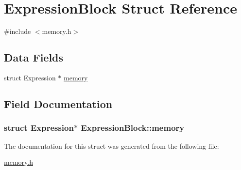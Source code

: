 \hypertarget{structExpressionBlock}{\section{Expression\+Block Struct Reference}
\label{structExpressionBlock}
}


{\ttfamily \#include $<$memory.\+h$>$}

\subsection*{Data Fields}
\begin{DoxyCompactItemize}
\item 
struct Expression $\ast$ \hyperlink{structExpressionBlock_a964183cfa856f56558c061035d539c86}{memory}
\end{DoxyCompactItemize}


\subsection{Field Documentation}
\hypertarget{structExpressionBlock_a964183cfa856f56558c061035d539c86}{
\subsubsection[{memory}]{\setlength{\rightskip}{0pt plus 5cm}struct Expression$\ast$ Expression\+Block\+::memory}}\label{structExpressionBlock_a964183cfa856f56558c061035d539c86}


The documentation for this struct was generated from the following file\+:\begin{DoxyCompactItemize}
\item 
\hyperlink{memory_8h}{memory.\+h}\end{DoxyCompactItemize}
